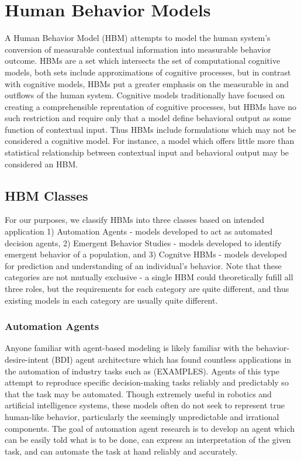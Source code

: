 \section{Human Behavior Models}
A Human Behavior Model (HBM) attempts to model the human system’s conversion of measurable contextual information into measurable behavior outcome. 
HBMs are a set which intersects the set of computational cognitive models, both sets include approximations of cognitive processes, but in contrast with cognitive models, HBMs put a greater emphasis on the measurable in and outflows of the human system.
Cognitive models traditionally have focused on creating a comprehensible reprentation of cognitive processes, but HBMs have no such restriction and require only that a model define behavioral output as some function of contextual input.
Thus HBMs include formulations which may not be considered a cognitive model.
For instance, a model which offers little more than statistical relationship between contextual input and behavioral output may be considered an HBM.

\subsection{HBM Classes}
For our purposes, we classify HBMs into three classes based on intended application 1) Automation Agents - models developed to act as automated decision agents, 2) Emergent Behavior Studies - models developed to identify emergent behavior of a population, and 3) Cognitve HBMs - models developed for prediction and understanding of an individual's behavior.
Note that these categories are not mutually exclusive - a single HBM could theoretically fufill all three roles, but the requirements for each category are quite different, and thus existing models in each category are usually quite different.

\subsubsection{Automation Agents}
Anyone familiar with agent-based modeling is likely familiar with the behavior-desire-intent (BDI) agent architecture which has found countless applications in the automation of industry tasks such as (EXAMPLES). 
Agents of this type attempt to reproduce specific decision-making tasks reliably and predictably so that the task may be automated. 
Though extremely useful in robotics and artificial intelligence systems, these models often do not seek to represent true human-like behavior, particularly the seemingly unpredictable and irrational components. 
The goal of automation agent research is to develop an agent which can be easily told what is to be done, can express an interpretation of the given task, and can automate the task at hand reliably and accurately.

